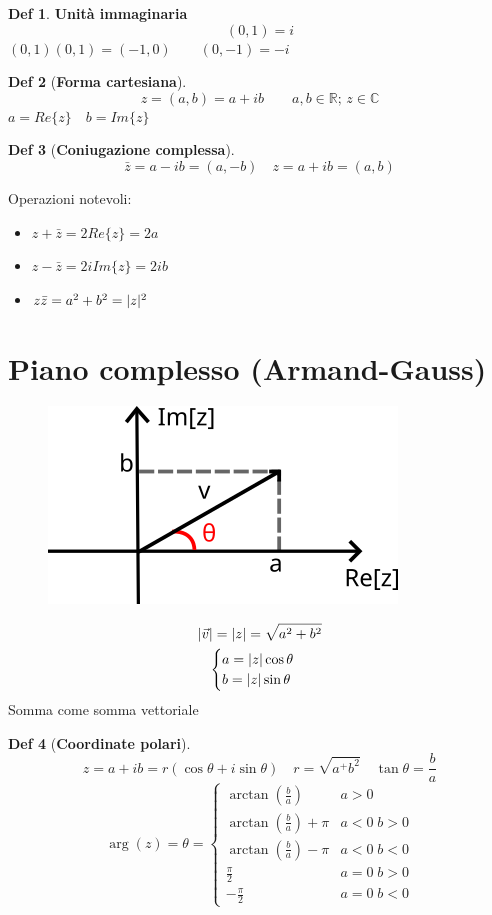 \documentclass[a4paper,11pt]{report}
\theoremstyle{remark}
\theoremstyle{definition}
\newtheorem*{Def}{Def}
\newcommand{\C}{\mathbb{C}}
\newcommand{\R}{\mathbb{R}}
\DeclarePairedDelimiter{\abs}{\lvert}{\rvert}
\begin{document}
\begin{Def}{\textbf{Unità immaginaria}}
	\[(0,1) = i\]
	$(0,1)(0,1) = (-1,0) \qquad (0,-1)=-i$
\end{Def}
\begin{Def}[\textbf{Forma cartesiana}]
	\[z = (a,b) = a + ib \qquad a,b \in \R; \, z \in \C\]
	$a = Re\{z\} \quad b=Im\{z\}$
\end{Def}
\begin{Def}[\textbf{Coniugazione complessa}]
	\[\bar{z} = a-ib = (a,-b) \quad z = a+ib = (a,b)\]
\end{Def}
Operazioni notevoli:
\begin{itemize}
	\item $z + \bar{z} = 2Re\{z\} = 2a$
	\item $z-\bar{z} = 2iIm\{z\} = 2ib$
	\item  $z\bar{z} = a^2+b^2 = \abs{z}^2$
\end{itemize}

\section{Piano complesso (Armand-Gauss)}
\begin{figure}
	\centering
	\includegraphics[width=0.4\linewidth]{immagini/piano_gauss}
\end{figure}
\begin{gather*}
	\abs{\vec{v}} = \abs{z} = \sqrt{a^2+b^2} \\
	\begin{cases}
		a = \abs{z}\cos\theta \\
		b = \abs{z}\sin\theta
	\end{cases}
\end{gather*}
Somma come somma vettoriale
\begin{Def}[\textbf{Coordinate polari}]
	\[z = a+ib = r(\cos\theta + i \sin\theta) \quad r= \sqrt{a^+b^2} \quad \tan\theta = \frac{b}{a}\]
	\[\arg(z)=\theta=
	\begin{cases}
		\arctan\left(\frac{b}{a}\right) & a>0 \\
		\arctan\left(\frac{b}{a}\right) + \pi & a<0 \; b>0 \\
		\arctan\left(\frac{b}{a}\right) -\pi & a<0 \; b<0 \\
		\frac{\pi}{2} & a=0 \; b>0 \\
		-\frac{\pi}{2} & a=0 \; b<0
	\end{cases}\]
\end{Def}
\end{document}
